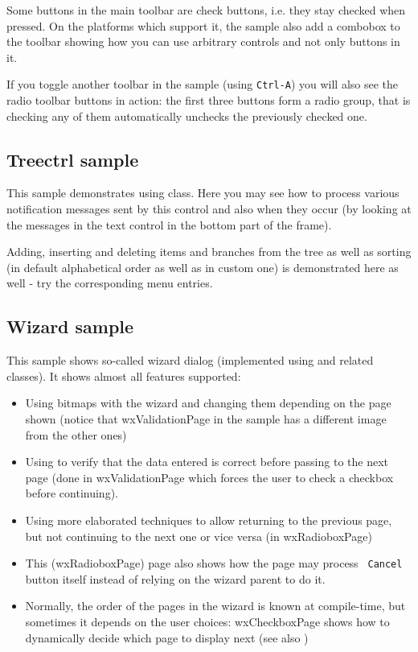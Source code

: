 Some buttons in the main toolbar are check buttons, i.e. they stay checked when
pressed. On the platforms which support it, the sample also add a combobox
to the toolbar showing how you can use arbitrary controls and not only buttons
in it.

If you toggle another toolbar in the sample (using {\tt Ctrl-A}) you will also
see the radio toolbar buttons in action: the first three buttons form a radio
group, that is checking any of them automatically unchecks the previously
checked one.

\subsection{Treectrl sample}\label{sampletreectrl}

This sample demonstrates using  class. Here
you may see how to process various notification messages sent by this control
and also when they occur (by looking at the messages in the text control in
the bottom part of the frame).

Adding, inserting and deleting items and branches from the tree as well as
sorting (in default alphabetical order as well as in custom one) is
demonstrated here as well - try the corresponding menu entries.

\subsection{Wizard sample}\label{samplewizard}

This sample shows so-called wizard dialog (implemented using 
 and related classes). It shows almost all
features supported:

\begin{itemize}\itemsep=0pt
\item Using bitmaps with the wizard and changing them depending on the page
shown (notice that wxValidationPage in the sample has a different image from
the other ones)
\item Using  
to verify that the data entered is correct before passing to the next page
(done in wxValidationPage which forces the user to check a checkbox before
continuing).
\item Using more elaborated techniques to allow returning to the previous
page, but not continuing to the next one or vice versa (in wxRadioboxPage)
\item This (wxRadioboxPage) page also shows how the page may process {\tt
Cancel} button itself instead of relying on the wizard parent to do it.
\item Normally, the order of the pages in the wizard is known at compile-time,
but sometimes it depends on the user choices: wxCheckboxPage shows how to
dynamically decide which page to display next (see also 
)
\end{itemize}

